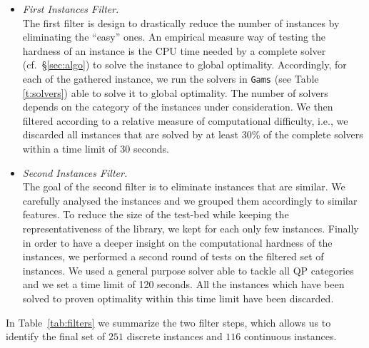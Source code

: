 \begin{itemize}

\item \emph{First Instances Filter.}\\
The first filter is design to drastically reduce the number of
instances by eliminating the ``easy'' ones. An empirical measure way
of testing the hardness of an instance is the CPU time needed by a
complete solver (cf.~\S \ref{sec:algo}) to solve the instance to
global optimality.
Accordingly, for each of the gathered instance, we run the solvers in
{\tt Gams} (see Table \ref{t:solvers}) able to solve it to global optimality.
The number of solvers depends on the category of the instances under
consideration.
We then filtered according to a relative measure of computational
difficulty, i.e., we discarded all instances that are solved by at
least 30\% of the complete solvers within a time limit of 30 seconds.

\item \emph{Second Instances Filter.}\\
The goal of the second filter is to eliminate instances that are similar.
We carefully analysed the instances and we grouped them accordingly to
similar features. To reduce the size of the test-bed
while keeping the representativeness of the library,   we kept for
each only few instances.
Finally in order to have a deeper insight on the computational hardness of the
instances, we performed a second round of tests on the filtered set of
instances.  We used a general purpose solver able to tackle all QP categories and we set a time limit of 120 seconds. 
All the instances which have been solved to
proven optimality within this time limit have been discarded.
\end{itemize}
In Table~\ref{tab:filters} we summarize the two filter steps, which
allows us to identify the final set of $251$ discrete instances and
$116$ continuous instances.








